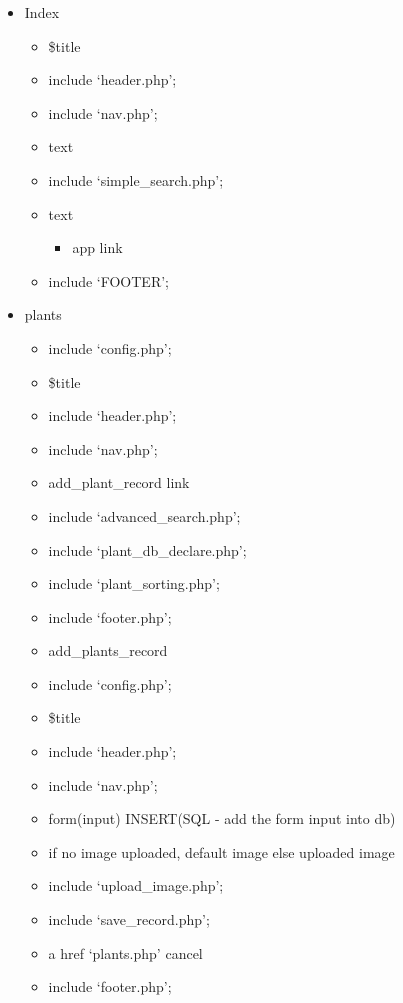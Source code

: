 \begin{itemize}
			
		\item Index
		\begin{itemize}
			\item \$title
			\item include `header.php';
			\item include `nav.php';
			\item text
			\item include `simple\_search.php';
			\item text
			\begin{itemize}
				\item app link
			\end{itemize}
			\item include `FOOTER';
		\end{itemize}
		\item plants
		\begin{itemize}
			\item include `config.php';
			\item \$title
			\item include `header.php';
			\item include `nav.php';
			\item add\_plant\_record link
			\item include `advanced\_search.php';
			\item include `plant\_db\_declare.php';
			\item include `plant\_sorting.php';
			\item include `footer.php';
		\end{itemize}

		\begin{itemize}
		\item add\_plants\_record
			\item include `config.php';
			\item \$title
			\item include `header.php';
			\item include `nav.php';
			\item form(input)  INSERT(SQL - add the form input into db)
			\item if no image uploaded, default image else uploaded image
			\item include `upload\_image.php';
			\item include `save\_record.php';
			\item a href `plants.php' cancel
			\item include `footer.php';
		\end{itemize}



\end{itemize}

